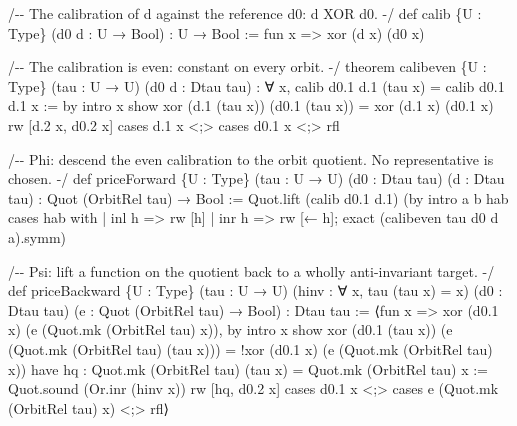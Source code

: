 \documentclass[10pt]{article}
\renewcommand{\_}{\origunderscore\allowbreak}
\newenvironment{Shaded}{}{}
\newcommand{\NormalTok}[1]{#1}
\begin{document}
\begin{Shaded}
\begin{Highlighting}[]
\NormalTok{/{-}{-} The calibration of d against the reference d0: d XOR d0. {-}/}
\NormalTok{def calib \{U : Type\} (d0 d : U → Bool) : U → Bool := fun x =\textgreater{} xor (d x) (d0 x)}

\NormalTok{/{-}{-} The calibration is even: constant on every orbit. {-}/}
\NormalTok{theorem calib\_even \{U : Type\} (tau : U → U) (d0 d : Dtau tau) :}
\NormalTok{    ∀ x, calib d0.1 d.1 (tau x) = calib d0.1 d.1 x := by}
\NormalTok{  intro x}
\NormalTok{  show xor (d.1 (tau x)) (d0.1 (tau x)) = xor (d.1 x) (d0.1 x)}
\NormalTok{  rw [d.2 x, d0.2 x]}
\NormalTok{  cases d.1 x \textless{};\textgreater{} cases d0.1 x \textless{};\textgreater{} rfl}

\NormalTok{/{-}{-} Phi: descend the even calibration to the orbit quotient. No representative is chosen. {-}/}
\NormalTok{def priceForward \{U : Type\} (tau : U → U) (d0 : Dtau tau) (d : Dtau tau) :}
\NormalTok{    Quot (OrbitRel tau) → Bool :=}
\NormalTok{  Quot.lift (calib d0.1 d.1) (by}
\NormalTok{    intro a b hab}
\NormalTok{    cases hab with}
\NormalTok{    | inl h =\textgreater{} rw [h]}
\NormalTok{    | inr h =\textgreater{} rw [← h]; exact (calib\_even tau d0 d a).symm)}

\NormalTok{/{-}{-} Psi: lift a function on the quotient back to a wholly anti{-}invariant target. {-}/}
\NormalTok{def priceBackward \{U : Type\} (tau : U → U) (hinv : ∀ x, tau (tau x) = x) (d0 : Dtau tau)}
\NormalTok{    (e : Quot (OrbitRel tau) → Bool) : Dtau tau :=}
\NormalTok{  ⟨fun x =\textgreater{} xor (d0.1 x) (e (Quot.mk (OrbitRel tau) x)), by}
\NormalTok{    intro x}
\NormalTok{    show xor (d0.1 (tau x)) (e (Quot.mk (OrbitRel tau) (tau x)))}
\NormalTok{       = !xor (d0.1 x) (e (Quot.mk (OrbitRel tau) x))}
\NormalTok{    have hq : Quot.mk (OrbitRel tau) (tau x) = Quot.mk (OrbitRel tau) x :=}
\NormalTok{      Quot.sound (Or.inr (hinv x))}
\NormalTok{    rw [hq, d0.2 x]}
\NormalTok{    cases d0.1 x \textless{};\textgreater{} cases e (Quot.mk (OrbitRel tau) x) \textless{};\textgreater{} rfl⟩}


\end{Highlighting}
\end{Shaded}
\end{document}
